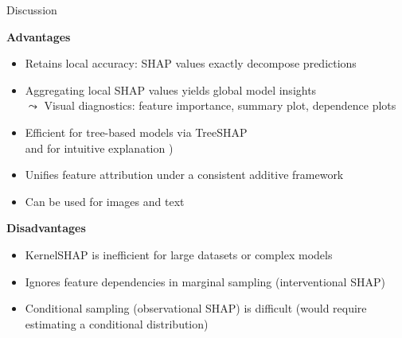 \documentclass[11pt,compress,t,notes=noshow, aspectratio=169, xcolor=table]{beamer}
\begin{document}
\begin{frame}{Discussion}

\textbf{Advantages}

\begin{itemize}
    \item Retains local accuracy: SHAP values exactly decompose predictions
    \item Aggregating local SHAP values yields global model insights\\
    $\leadsto$ Visual diagnostics: feature importance, summary plot, dependence plots
    \item Efficient for tree-based models via TreeSHAP\\
     and for intuitive explanation )
    \item Unifies feature attribution under a consistent additive framework
    
    \item Can be used for images   and text 
\end{itemize}

\medskip

\textbf{Disadvantages}

\begin{itemize}
  \item KernelSHAP is inefficient for large datasets or complex models
   \item Ignores feature dependencies in marginal sampling (interventional SHAP)
   \item Conditional sampling (observational SHAP) is difficult (would require estimating a conditional distribution)
 

\end{itemize}
\end{frame}
\end{document}
